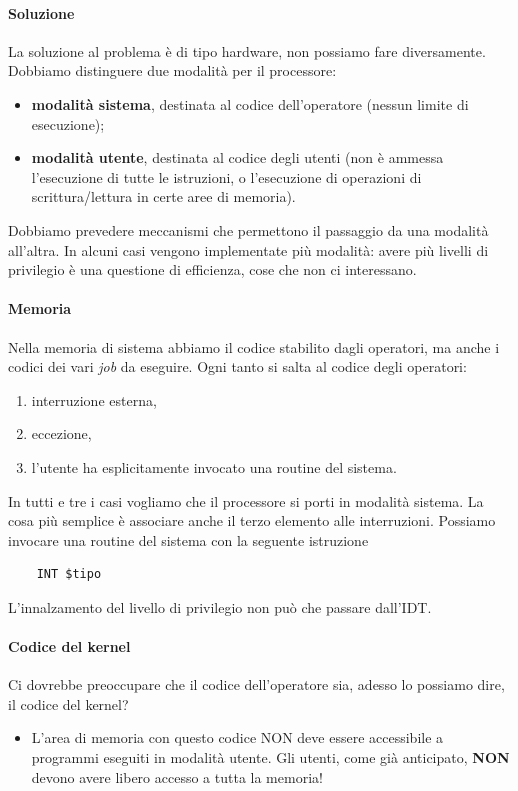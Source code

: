 \paragraph{Soluzione} La soluzione al problema è di tipo hardware, non possiamo fare diversamente. Dobbiamo distinguere due modalità per il processore:
\begin{itemize}
	\item \textbf{modalità sistema}, destinata al codice dell'operatore (nessun limite di esecuzione);
	\item \textbf{modalità utente}, destinata al codice degli utenti (non è ammessa l'esecuzione di tutte le istruzioni, o l'esecuzione di operazioni di scrittura/lettura in certe aree di memoria).
\end{itemize}
Dobbiamo prevedere meccanismi che permettono il passaggio da una modalità all'altra. In alcuni casi vengono implementate più modalità: avere più livelli di privilegio è una questione di efficienza, cose che non ci interessano.
\paragraph{Memoria} Nella memoria di sistema abbiamo il codice stabilito dagli operatori, ma anche i codici dei vari \emph{job} da eseguire. Ogni tanto si salta al codice degli operatori:
\begin{enumerate}
	\item interruzione esterna,
	\item eccezione,
	\item l'utente ha esplicitamente invocato una routine del sistema.
\end{enumerate}
In tutti e tre i casi vogliamo che il processore si porti in modalità sistema. La cosa più semplice è associare anche il terzo elemento alle interruzioni. Possiamo invocare una routine del sistema con la seguente istruzione
\begin{verbatim}
	INT $tipo
\end{verbatim}
L'innalzamento del livello di privilegio non può che passare dall'IDT.
\paragraph{Codice del kernel} Ci dovrebbe preoccupare che il codice dell'operatore sia, adesso lo possiamo dire, il codice del kernel? 
\begin{itemize}
	\item L'area di memoria con questo codice NON deve essere accessibile a programmi eseguiti in modalità utente. Gli utenti, come già anticipato, \textbf{NON} devono avere libero accesso a tutta la memoria!
\end{itemize}
